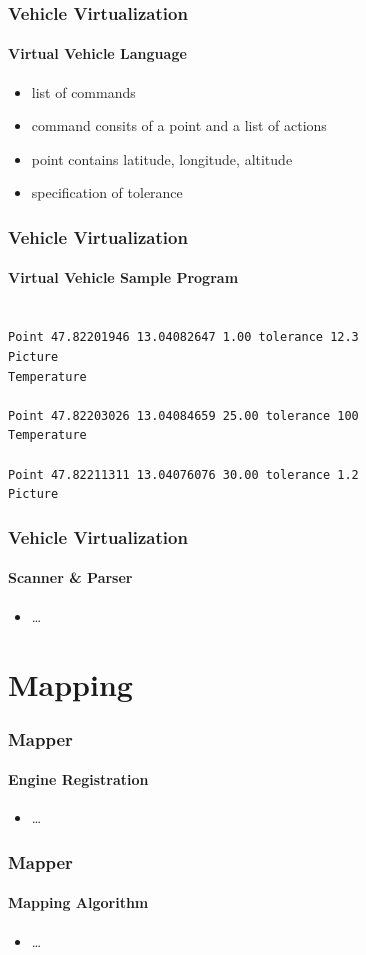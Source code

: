 \documentclass{beamer}
\begin{document}
\begin{frame}\frametitle{Vehicle Virtualization}\framesubtitle{Virtual Vehicle Language}
\begin{itemize}
\item list of commands
\item command consits of a point and a list of actions
\item point contains latitude, longitude, altitude
\item specification of tolerance
\end{itemize} 
\end{frame}

\begin{frame}\frametitle{Vehicle Virtualization}\framesubtitle{Virtual Vehicle Sample Program}
\texttt{\\
Point 47.82201946 13.04082647 1.00 tolerance 12.3\\
Picture \\
Temperature\\
\\
Point 47.82203026 13.04084659 25.00 tolerance 100 \\
Temperature\\
\\
Point 47.82211311 13.04076076 30.00 tolerance 1.2\\
Picture} 
\end{frame}

\begin{frame}\frametitle{Vehicle Virtualization}\framesubtitle{Scanner \& Parser}
\begin{itemize}
\item \ldots
\end{itemize} 
\end{frame}

\section{Mapping}

\begin{frame}\frametitle{Mapper}\framesubtitle{Engine Registration}
	\begin{itemize}
		\item \ldots
	\end{itemize} 
\end{frame}

\begin{frame}\frametitle{Mapper}\framesubtitle{Mapping Algorithm}
	\begin{itemize}
		\item \ldots
	\end{itemize} 
\end{frame}
\end{document}
